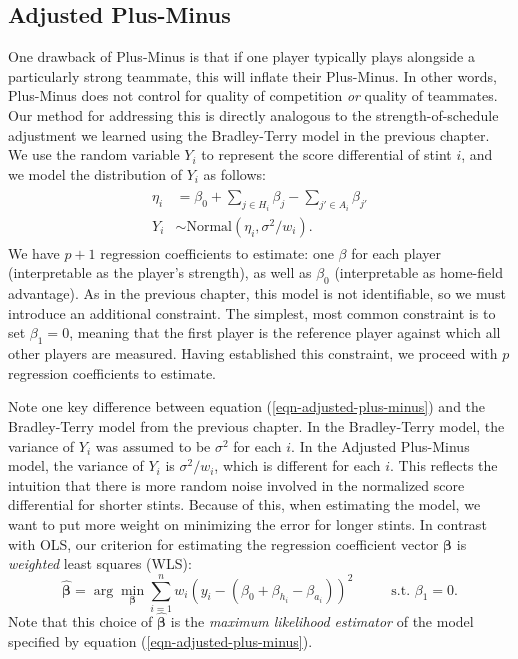 \documentclass{article}
\begin{document}
  \subsection{\sc Adjusted Plus-Minus}

  One drawback of Plus-Minus is that if one player typically plays alongside a particularly strong teammate, this will inflate their Plus-Minus. In other words, Plus-Minus does not control for quality of competition {\it or} quality of teammates. Our method for addressing this is directly analogous to the strength-of-schedule adjustment we learned using the Bradley-Terry model in the previous chapter. We use the random variable $Y_i$ to represent the score differential of stint $i$, and we model the distribution of $Y_i$ as follows:
  \begin{align}
    \label{eqn-adjusted-plus-minus}
    \begin{split}
      \eta_i &= \beta_0 + \sum_{j \in H_i}\beta_{j} - \sum_{j' \in A_i}\beta_{j'}\\
      Y_i &\sim \mbox{Normal}(\eta_i, \sigma^2 / w_i).
    \end{split}
  \end{align}
  We have $p + 1$ regression coefficients to estimate: one $\beta$ for each player (interpretable as the player's strength), as well as $\beta_0$ (interpretable as home-field advantage). As in the previous chapter, this model is not identifiable, so we must introduce an additional constraint. The simplest, most common constraint is to set $\beta_1 = 0$, meaning that the first player is the reference player against which all other players are measured. Having established this constraint, we proceed with $p$ regression coefficients to estimate.

  Note one key difference between equation (\ref{eqn-adjusted-plus-minus}) and the Bradley-Terry model from the previous chapter. In the Bradley-Terry model, the variance of $Y_i$ was assumed to be $\sigma^2$ for each $i$. In the Adjusted Plus-Minus model, the variance of $Y_i$ is $\sigma^2 / w_i$, which is different for each $i$. This reflects the intuition that there is more random noise involved in the normalized score differential for shorter stints. Because of this, when estimating the model, we want to put more weight on minimizing the error for longer stints. In contrast with OLS, our criterion for estimating the regression coefficient vector $\boldsymbol{\beta}$ is {\it weighted} least squares (WLS):
  \begin{equation}
    \label{eqn-weighted-squares}
    \boldsymbol{\hat\beta} = \arg\min_{\boldsymbol{\beta}} \sum_{i=1}^n w_i (y_i - (\beta_0 + \beta_{h_i} - \beta_{a_i}))^2 \hspace{1cm} \mbox{ s.t. } \beta_1 = 0.
  \end{equation}
  Note that this choice of $\boldsymbol{\hat\beta}$ is the {\it maximum likelihood estimator} of the model specified by equation (\ref{eqn-adjusted-plus-minus}).
\end{document}
